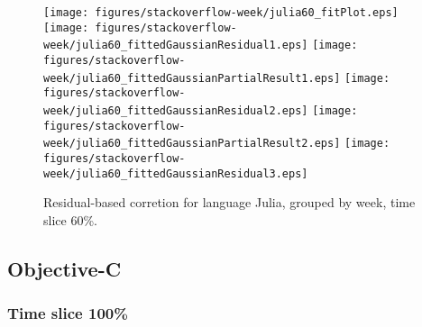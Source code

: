 \begin{figure}[hb]
\centering
{}
{\texttt{[image: figures/stackoverflow-week/julia60\_fitPlot.eps]}}
{\texttt{[image: figures/stackoverflow-week/julia60\_fittedGaussianResidual1.eps]}}
{\texttt{[image: figures/stackoverflow-week/julia60\_fittedGaussianPartialResult1.eps]}}
{\texttt{[image: figures/stackoverflow-week/julia60\_fittedGaussianResidual2.eps]}}
{\texttt{[image: figures/stackoverflow-week/julia60\_fittedGaussianPartialResult2.eps]}}
{\texttt{[image: figures/stackoverflow-week/julia60\_fittedGaussianResidual3.eps]}}
\caption{Residual-based corretion for language Julia, grouped by week, time slice 60\%.}
\end{figure}


\clearpage 
\newpage 


\subsection{Objective-C}

\FloatBarrier

\subsubsection{Time slice 100\%}

